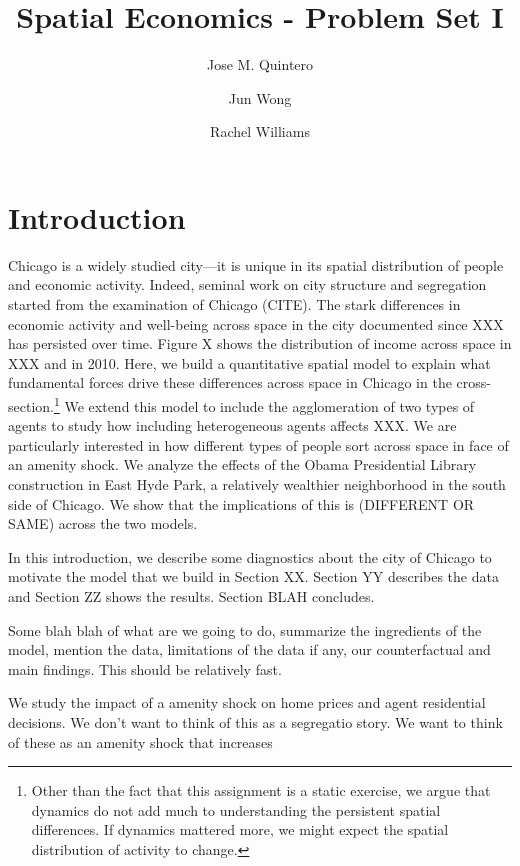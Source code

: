 \documentclass[12pt]{article}
\title{Spatial Economics - Problem Set I}
\author{Jose M. Quintero \and Jun Wong \and Rachel Williams}
\begin{document}
\maketitle

\section{Introduction}


Chicago is a widely studied city---it is unique in its spatial distribution of people and economic activity. Indeed, seminal work on city structure and segregation started from the examination of Chicago (CITE). The stark differences in economic activity and well-being across space in the city documented since XXX has persisted over time. Figure X shows the distribution of income across space in XXX and in 2010. Here, we build a quantitative spatial model to explain what fundamental forces drive these differences across space in Chicago in the cross-section.\footnote{Other than the fact that this assignment is a static exercise, we argue that dynamics do not add much to understanding the persistent spatial differences. If dynamics mattered more, we might expect the spatial distribution of activity to change.} We extend this model to include the agglomeration of two types of agents to study how including heterogeneous agents affects XXX. We are particularly interested in how different types of people sort across space in face of an amenity shock. We analyze the effects of the Obama Presidential Library construction in East Hyde Park, a relatively wealthier neighborhood in the south side of Chicago. We show that the implications of this is (DIFFERENT OR SAME) across the two models.


In this introduction, we describe some diagnostics about the city of Chicago to motivate the model that we build in Section XX. Section YY describes the data and Section ZZ shows the results. Section BLAH concludes.

Some blah blah of what are we going to do, summarize the ingredients of the model, mention the data, limitations of the data if any, our counterfactual and main findings. This should be relatively fast. 

We study the impact of a amenity shock on home prices and agent residential decisions. We don't want to think of this as a segregatio story. We want to think of these as an amenity shock that increases 
\end{document}

